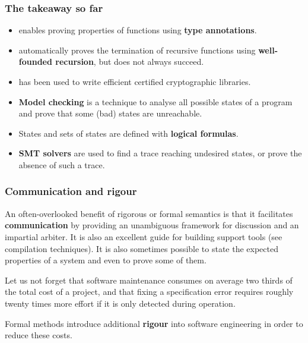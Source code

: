 \documentclass[compress,dvipdfmx]{beamer}
\begin{document}
\begin{frame}
  \frametitle{The takeaway so far}

  \begin{itemize}

    \item \Fstar enables proving properties of functions using
      \textbf{type annotations}.

    \item \Fstar automatically proves the termination of recursive
      functions using \textbf{well-founded recursion}, but does not
      always succeed.

    \item \Fstar has been used to write efficient certified
      cryptographic libraries.

    \item \textbf{Model checking} is a technique to analyse all
      possible states of a program and prove that some (bad) states
      are unreachable.

    \item States and sets of states are defined with \textbf{logical
      formulas}.

    \item \textbf{SMT solvers} are used to find a trace reaching
      undesired states, or prove the absence of such a trace.


  \end{itemize}

\end{frame}

%
\begin{frame}
  \frametitle{Communication and rigour}

  An often-overlooked benefit of rigorous or formal semantics is that
  it facilitates \textbf{communication} by providing an unambiguous
  framework for discussion and an impartial arbiter. It is also an
  excellent guide for building support tools (see compilation
  techniques). It is also sometimes possible to state the expected
  properties of a system and even to prove some of them.

  \bigskip

  Let us not forget that software maintenance consumes on average two
  thirds of the total cost of a project, and that fixing a
  specification error requires roughly twenty times more effort if it
  is only detected during operation.

  \bigskip

  Formal methods introduce additional \textbf{rigour} into software
  engineering in order to reduce these costs.

\end{frame}
\end{document}
